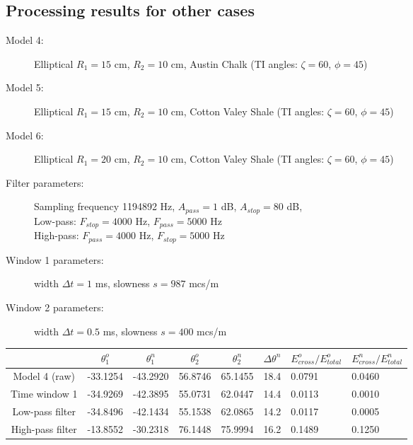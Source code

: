 \documentclass[a4paper,11pt]{article}
\begin{document}
\subsection*{Processing results for other cases}

\begin{description}
\item[Model 4:] Elliptical $R_1=15$ cm, $R_2=10$ cm, Austin Chalk (TI angles: $\zeta=60$\textdegree, $\phi=45$\textdegree) 
\item[Model 5:] Elliptical $R_1=15$ cm, $R_2=10$ cm, Cotton Valey Shale (TI angles: $\zeta=60$\textdegree, $\phi=45$\textdegree) 
\item[Model 6:] Elliptical $R_1=20$ cm, $R_2=10$ cm, Cotton Valey Shale (TI angles: $\zeta=60$\textdegree, $\phi=45$\textdegree) 
\end{description}

\begin{description}
\item[Filter parameters:] Sampling frequency 1194892 Hz, $A_{pass} = 1$ dB, $A_{stop} = 80$ dB, \\ Low-pass: $F_{stop} = 4000$ Hz, $F_{pass} = 5000$ Hz \\ High-pass: $F_{pass} = 4000$ Hz, $F_{stop} = 5000$ Hz
\item[Window 1 parameters:] width $\Delta t=1$ ms, slowness $s = 987$ mcs/m
\item[Window 2 parameters:] width $\Delta t=0.5$ ms, slowness $s = 400$ mcs/m
\end{description}

\renewcommand{\arraystretch}{1.5}
\footnotesize
\begin{tabular}{c|rr|rr|r|ll}
				&\multicolumn{1}{c}{$\theta_1^o$} & \multicolumn{1}{c|}{$\theta_1^n$} & \multicolumn{1}{c}{$\theta_2^o$} & \multicolumn{1}{c|}{$\theta_2^n$} & \multicolumn{1}{c|}{$\Delta\theta^n$}& \multicolumn{1}{c}{$E_{cross}^o/E_{total}^o$} & \multicolumn{1}{c}{$E_{cross}^n/E_{total}^n$} \\ \hline
\hline  Model 4 (raw) & -33.1254 & -43.2920 & 56.8746 & 65.1455 & 18.4 & 0.0791 & 0.0460 \\
		Time window 1 & -34.9269 & -42.3895 & 55.0731 & 62.0447 & 14.4 & 0.0113 & 0.0010 \\
	   Low-pass filter & -34.8496 & -42.1434 & 55.1538 & 62.0865 & 14.2 & 0.0117 & 0.0005 \\
 	   High-pass filter & -13.8552 & -30.2318 & 76.1448 & 75.9994 & 16.2 & 0.1489 & 0.1250 \\ 	   
 	    \hline 
\end{tabular} 
\normalsize
\renewcommand{\arraystretch}{1.0}
\end{document}
